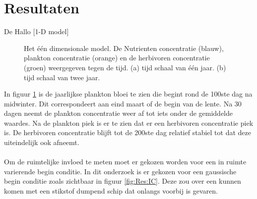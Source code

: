 \section{Resultaten}
De
Hallo
[1-D model]
\begin{figure}[H]
    \centering

    \caption{Het één dimensionale model. De Nutrienten concentratie (blauw), plankton concentratie (orange) en de herbivoren concentratie (groen) weergegeven tegen de tijd. (a) tijd schaal van één jaar. (b) tijd schaal van twee jaar.
    }
    \label{fig:Res:Simple}
\end{figure}
In figuur \ref{fig:Res:Simple} is de jaarlijkse plankton bloei te zien die begint rond de 100ste dag na midwinter. Dit correspondeert aan eind maart of de begin van de lente. Na 30 dagen neemt de plankton concentratie weer af tot iets onder de gemiddelde waardes. Na de plankton piek is er te zien dat er een herbivoren concentratie piek is. De herbivoren concentratie blijft tot de 200ste dag relatief stabiel tot dat deze uiteindelijk ook afneemt.\\
\\
Om de ruimtelijke invloed te meten moet er gekozen worden voor een in ruimte varierende begin conditie. In dit onderzoek is er gekozen voor een gaussische begin conditie zoals zichtbaar in figuur \ref{fig:Res:IC}. Deze zou over een kunnen komen met een stikstof dumpend schip dat onlangs voorbij is gevaren.

